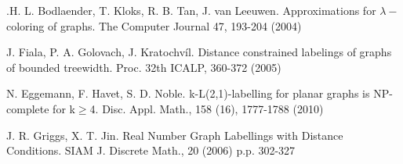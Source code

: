 \documentclass[smallextended]{svjour3}
\begin{document}
\begin{thebibliography}{1}
.H. L. Bodlaender, T. Kloks, R. B. Tan, J. van Leeuwen.
Approximations for $\lambda-$coloring of graphs. The Computer Journal
47, 193-204 (2004)



J. Fiala, P. A. Golovach, J. Kratochvíl. Distance
constrained labelings of graphs of bounded treewidth. Proc. 32th ICALP,
360-372 (2005)



N. Eggemann, F. Havet, S. D. Noble. k-L(2,1)-labelling
for planar graphs is NP-complete for k$\geq$4. Disc. Appl. Math.,
158 (16), 1777-1788 (2010)



J. R. Griggs, X. T. Jin. Real Number Graph Labellings with Distance Conditions. 
SIAM J. Discrete Math., 20 (2006) p.p. 302-327

\end{thebibliography}
\end{document}
